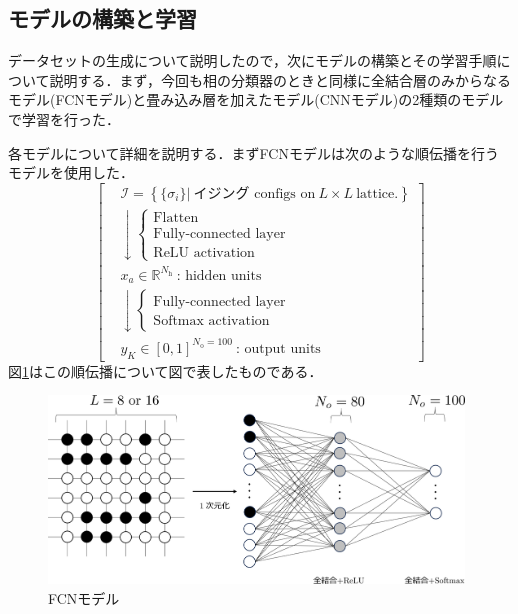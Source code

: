 \documentclass[a4paper,11pt]{jsreport}
\begin{document}
\subsection{モデルの構築と学習}
データセットの生成について説明したので，次にモデルの構築とその学習手順について説明する．まず，今回も相の分類器のときと同様に全結合層のみからなるモデル(FCNモデル)と畳み込み層を加えたモデル(CNNモデル)の2種類のモデルで学習を行った．\par
各モデルについて詳細を説明する．まずFCNモデルは次のような順伝播を行うモデルを使用した．
\begin{equation}
  \left[
    \begin{aligned}
      & \mathcal{I} = \left\{ \{ \sigma_i \} \Big| \ \text{イジング configs on} \ L \times L \ \text{lattice.} \right\} \\
       & \downarrow
      \begin{cases}
        \text{Flatten} \\
        \text{Fully-connected layer} \\
        \text{ReLU activation}
      \end{cases} \\
       & x_a \in \mathbb{R}^{N_{\text{h}}} \ \text{: hidden units} \\
       & \downarrow
      \begin{cases}
        \text{Fully-connected layer} \\
        \text{Softmax activation}
      \end{cases} \\
       & y_K \in [0,1]^{N_{\text{o}}=100} \ \text{: output units}
    \end{aligned}
    \right]
\end{equation}
図\ref{温度測定器FCNモデル}はこの順伝播について図で表したものである．
\begin{figure}[H]
  \begin{center}
    \includegraphics[height=5cm]{image/温度測定器FCN.png}
    \caption{FCNモデル}
    \label{温度測定器FCNモデル}
  \end{center}
\end{figure}
\end{document}

